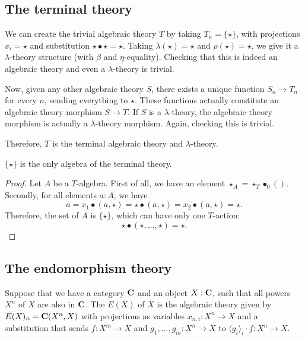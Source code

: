 \subsection{The terminal theory}
\begin{example}
  We can create the trivial algebraic theory $ T $ by taking $ T_n = \{ \star \} $, with projections $ x_i = \star $ and substitution $ \star \bullet \star = \star $. Taking $ \lambda(\star) = \star $ and $ \rho(\star) = \star $, we give it a $ \lambda $-theory structure (with $ \beta $ and $ \eta $-equality). Checking that this is indeed an algebraic theory and even a $ \lambda $-theory is trivial.

  Now, given any other algebraic theory $ S $, there exists a unique function $ S_n \to T_n $ for every $ n $, sending everything to $ \star $. These functions actually constitute an algebraic theory morphism $ S \to T $. If $ S $ is a $ \lambda $-theory, the algebraic theory morphism is actually a $ \lambda $-theory morphism. Again, checking this is trivial.

  Therefore, $ T $ is the terminal algebraic theory and $ \lambda $-theory.
\end{example}

\begin{lemma}
  $ \{ \star \} $ is the only algebra of the terminal theory.
\end{lemma}
\begin{proof}
  Let $ A $ be a $ T $-algebra. First of all, we have an element $ \star_A = \star_T \bullet_{0} () $. Secondly, for all elements $ a: A $, we have
  \[ a = x_1 \bullet (a, \star) = \star \bullet (a, \star) = x_2 \bullet (a, \star) = \star. \]
  Therefore, the set of $ A $ is $ \{ \star \} $, which can have only one $ T $-action:
  \[ \star \bullet (\star, \dots, \star) = \star. \]
\end{proof}

\subsection{The endomorphism theory}

\begin{definition}\label{def:endomorphism-theory}
  Suppose that we have a category $ \mathbf{C} $ and an object $ X: \mathbf{C} $, such that all powers $ X^n $ of $ X $ are also in $ \mathbf{C} $.
  The  $ E(X) $ of $ X $ is the algebraic theory given by $ E(X)_n = \mathbf{C}(X^n, X) $ with projections as variables $ x_{n, i}: X^n \to X $ and a substitution that sends $ f: X^m \to X $ and $ g_1, \dots, g_m: X^n \to X $ to $ \langle g_i \rangle_i \cdot f: X^n \to X $.
\end{definition}

